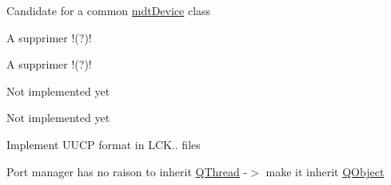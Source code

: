 \begin{DoxyRefList}
Candidate for a common \hyperlink{classmdt_device}{mdt\-Device} class  
\item[\label{todo__todo000009}%
\hypertarget{todo__todo000009}{}%
Class \hyperlink{classmdt_device_u3606_a_widget}{mdt\-Device\-U3606\-A\-Widget} ]A supprimer !(?)!  
\item[\label{todo__todo000008}%
\hypertarget{todo__todo000008}{}%
Member \hyperlink{classmdt_device_u3606_a_widget_a653d85749d67555d8c3a43a779b6d2a2}{mdt\-Device\-U3606\-A\-Widget\-:\-:mdt\-Device\-U3606\-A\-Widget} (\hyperlink{class_q_widget}{Q\-Widget} $\ast$parent=0)]A supprimer !(?)!  
\item[\label{todo__todo000097}%
\hypertarget{todo__todo000097}{}%
Member \hyperlink{classmdt_frame_codec_scpi_aa6596dc898438be704191ad282d02100}{mdt\-Frame\-Codec\-Scpi\-:\-:decode\-I\-E\-E\-Edata\-Ascii} (const Q\-Byte\-Array \&data)]Not implemented yet  
\item[\label{todo__todo000098}%
\hypertarget{todo__todo000098}{}%
Member \hyperlink{classmdt_frame_codec_scpi_ab70c6c3d2d91ddff065952b6c2db8345}{mdt\-Frame\-Codec\-Scpi\-:\-:decode\-I\-E\-E\-Edata\-Byte} (const Q\-Byte\-Array \&data)]Not implemented yet  
\item[\label{todo__todo000023}%
\hypertarget{todo__todo000023}{}%
Class \hyperlink{classmdt_port_lock}{mdt\-Port\-Lock} ]Implement U\-U\-C\-P format in L\-C\-K.. files  
\item[\label{todo__todo000030}%
\hypertarget{todo__todo000030}{}%
Class \hyperlink{classmdt_port_manager}{mdt\-Port\-Manager} ]Port manager has no raison to inherit \hyperlink{class_q_thread}{Q\-Thread} -\/$>$ make it inherit \hyperlink{class_q_object}{Q\-Object} 


\end{DoxyRefList}
